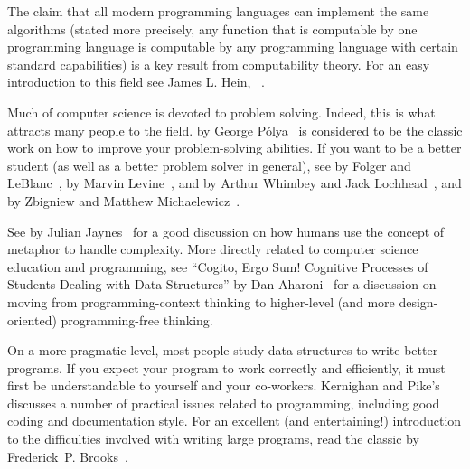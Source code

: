 The claim that all modern programming languages can implement the same
algorithms (stated more precisely, any function that is computable by
one programming language is computable by any programming language
with certain standard capabilities) is a key result from
computability theory.
For an easy introduction to this field see James L. Hein,
~\cite{Hein}.

Much of computer science is devoted to problem solving.
Indeed, this is what attracts many people to the field.
 by George P\'olya~\cite{Polya} is
considered to be the classic work on how to improve your
problem-solving abilities.
If you want to be a better student (as well as a better problem solver
in general), see
 by
Folger and LeBlanc~\cite{Folger},
 by Marvin Levine~\cite{Levine},
and  by
Arthur Whimbey and Jack Lochhead~\cite{WhimLoch}, and
 by Zbigniew and Matthew
Michaelewicz~\cite{Puzzle}.

See  by Julian Jaynes~\cite{Jaynes} for a good
discussion on how humans use the concept of metaphor to handle
complexity.
More directly related to computer science education and programming,
see ``Cogito, Ergo Sum! Cognitive Processes of Students Dealing with
Data Structures'' by Dan Aharoni~\cite{Aharoni} for a discussion on
moving from programming-context thinking to higher-level (and more
design-oriented) programming-free thinking.

On a more pragmatic level, most people study data structures to write
better programs.
If you expect your program to work correctly and efficiently, it must
first be understandable to yourself and your co-workers.
Kernighan and Pike's
~\cite{KPpractice} discusses a number of 
practical issues related to programming, including 
good coding and documentation style.
For an excellent (and entertaining!) introduction to the
difficulties involved with writing large programs,
read the classic
 by
Frederick~P. Brooks~\cite{Brooks}.

